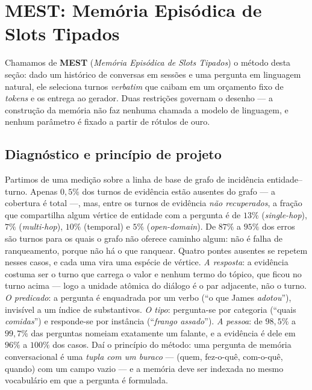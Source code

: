 
\section{MEST: Memória Episódica de Slots Tipados}
\label{sec:metodo}

Chamamos de \textbf{MEST} (\emph{Memória Episódica de Slots Tipados}) o método
desta seção: dado um histórico de conversas em sessões e uma pergunta em
linguagem natural, ele seleciona turnos \emph{verbatim} que caibam em um
orçamento fixo de \emph{tokens} e os entrega ao gerador. Duas restrições governam
o desenho --- a construção da memória não faz nenhuma chamada a modelo de
linguagem, e nenhum parâmetro é fixado a partir de rótulos de ouro.

\subsection{Diagnóstico e princípio de projeto}
\label{sec:metodo:diagnostico}

Partimos de uma medição sobre a linha de base de grafo de incidência
entidade--turno. Apenas $0{,}5\%$ dos turnos de evidência estão ausentes do grafo
--- a cobertura é total ---, mas, entre os turnos de evidência \emph{não
recuperados}, a fração que compartilha algum vértice de entidade com a pergunta é
de $13\%$ (\emph{single-hop}), $7\%$ (\emph{multi-hop}), $10\%$ (temporal) e $5\%$
(\emph{open-domain}). De $87\%$ a $95\%$ dos erros são turnos para os quais o
grafo não oferece caminho algum: não é falha de ranqueamento, porque não há o que
ranquear. Quatro pontes ausentes se repetem nesses casos, e cada uma vira uma
espécie de vértice. \emph{A resposta}: a evidência costuma ser o turno que carrega
o valor e nenhum termo do tópico, que ficou no turno acima --- logo a unidade
atômica do diálogo é o par adjacente, não o turno. \emph{O predicado}: a pergunta
é enquadrada por um verbo (``o que James \emph{adotou}''), invisível a um índice
de substantivos. \emph{O tipo}: pergunta-se por categoria (``quais
\emph{comidas}'') e responde-se por instância (``\emph{frango assado}'').
\emph{A pessoa}: de $98{,}5\%$ a $99{,}7\%$ das perguntas nomeiam exatamente um
falante, e a evidência é dele em $96\%$ a $100\%$ dos casos. Daí o princípio do
método: uma pergunta de memória conversacional é uma \emph{tupla com um buraco}
--- (quem, fez-o-quê, com-o-quê, quando) com um campo vazio --- e a memória deve
ser indexada no mesmo vocabulário em que a pergunta é formulada.


